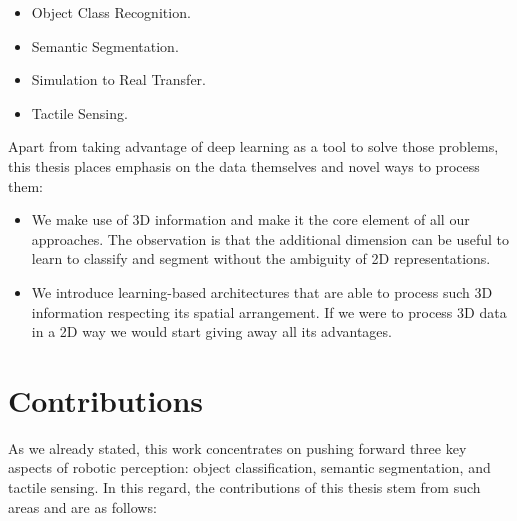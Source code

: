 \begin{itemize}
    \item Object Class Recognition.
    \item Semantic Segmentation.
    \item Simulation to Real Transfer.
    \item Tactile Sensing.
\end{itemize}

Apart from taking advantage of deep learning as a tool to solve those problems, this thesis places emphasis on the data themselves and novel ways to process them:

\begin{itemize}
    \item We make use of \ac{3D} information and make it the core element of all our approaches. The observation is that the additional dimension can be useful to learn to classify and segment without the ambiguity of \ac{2D} representations.
    \item We introduce learning-based architectures that are able to process such \ac{3D} information respecting its spatial arrangement. If we were to process \ac{3D} data in a \ac{2D} way we would start giving away all its advantages.
\end{itemize}

\section{Contributions}
\label{cha:introduction:sec:contributions}

As we already stated, this work concentrates on pushing forward three key aspects of robotic perception: object classification, semantic segmentation, and tactile sensing. In this regard, the contributions of this thesis stem from such areas and are as follows:


